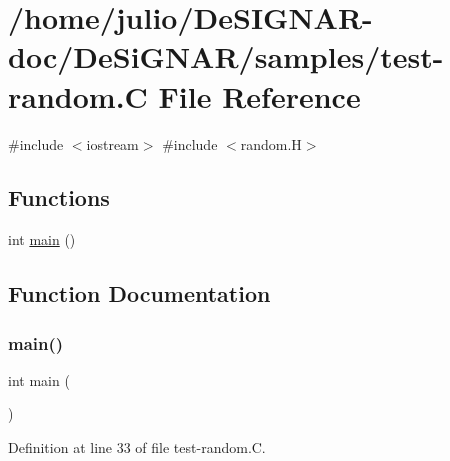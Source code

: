 \hypertarget{test-random_8_c}{}\section{/home/julio/\+De\+S\+I\+G\+N\+A\+R-\/doc/\+De\+Si\+G\+N\+A\+R/samples/test-\/random.C File Reference}
\label{test-random_8_c}
{\ttfamily \#include $<$iostream$>$}\newline
{\ttfamily \#include $<$random.\+H$>$}\newline
\subsection*{Functions}
\begin{DoxyCompactItemize}
\item 
int \hyperlink{test-random_8_c_ae66f6b31b5ad750f1fe042a706a4e3d4}{main} ()
\end{DoxyCompactItemize}


\subsection{Function Documentation}
\mbox{\label{test-random_8_c_ae66f6b31b5ad750f1fe042a706a4e3d4}} 
\subsubsection{\texorpdfstring{main()}{main()}}
{\footnotesize\ttfamily int main (\begin{DoxyParamCaption}{ }\end{DoxyParamCaption})}



Definition at line 33 of file test-\/random.\+C.

